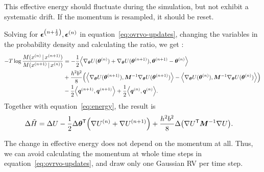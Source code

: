 \documentclass{article}
\newcommand{\gradat}[1]{{\nabla_\vtheta U(\vtheta\ssup{#1})}}
\begin{document}
This effective energy should fluctuate during the simulation, but not exhibit a
systematic drift. If the momentum is resampled, it should be reset.

Solving for ${\boldsymbol\epsilon}^{{\left( n+\frac{1}{2} \right)}}, {\boldsymbol\epsilon}^{{\left( n \right)}}$ in
equation~\ref{eq:ovrvo-updates}, changing the variables in the probability density and
calculating the ratio, we get \citep{bussi-parrinello}:
\begin{align*}
  -T\log \frac{M(x\ssup{n} \vbar x\ssup{n+1})}
  {M(x\ssup{n+1} \vbar x\ssup{n})}
  &=
    -\frac{1}{2}\angbra{\gradat{n} + \gradat{n+1}, \vtheta\ssup{n+1} - \vtheta\ssup{n}} \\
  &+ \frac{h^2b^2}{8}\bra{\angbra{\gradat{n+1}, \vM^{-1}\gradat{n+1}} - \angbra{\gradat{n}, \vM^{-1}\gradat{n}}} \\
  &- \frac{1}{2}\angbra{\vq\ssup{n+1}, \vq\ssup{n+1}} + \frac{1}{2}\angbra{\vq\ssup{n}, \vq\ssup{n}}.
\end{align*}
Together with equation~\ref{eq:energy}, the result is
\begin{align*}
  \Delta\tilde{H} &= \Delta U -\frac{1}{2}\Delta{\boldsymbol\theta}^{\mathsf{T}} {\left( \nabla U^{{\left( n \right)}} + \nabla U^{{\left( n+1 \right)}} \right)}
                    + \frac{h^2b^2}{8}\Delta{\left( \nabla U^{\mathsf{T}}{\bm{M}}^{-1}\nabla U \right)}.
\end{align*}

The change in effective energy does not depend on the momentum at all. Thus, we
can avoid calculating the momentum at whole time steps in
equation~\ref{eq:ovrvo-updates}, and draw only one Gaussian RV per time step.

\printbibliography
\end{document}
